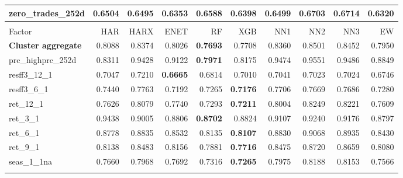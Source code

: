 \begin{longtable}{>{\raggedright\arraybackslash}p{2.6cm}rrrrrrrrr}
zero\_trades\_252d & 0.6504 & \cellcolor{blue!10}0.6495 & \cellcolor{blue!10}0.6353 & 0.6588 & \cellcolor{blue!10}0.6398 & \cellcolor{blue!10}0.6499 & 0.6703 & 0.6714 & \textbf{\cellcolor{blue!10}0.6320} \\
\hline
\multicolumn{10}{@{}l}{\textit{Panel F. Momentum}} \\
\hline
Factor & HAR & HARX & ENET & RF & XGB & NN1 & NN2 & NN3 & EW \\
\hline
\textbf{Cluster aggregate} & 0.8088 & 0.8374 & \cellcolor{blue!10}0.8026 & \textbf{\cellcolor{blue!10}0.7693} & \cellcolor{blue!10}0.7708 & 0.8360 & 0.8501 & 0.8452 & \cellcolor{blue!10}0.7950 \\
prc\_highprc\_252d & 0.8311 & 0.9428 & 0.9122 & \textbf{\cellcolor{blue!10}0.7971} & \cellcolor{blue!10}0.8175 & 0.9474 & 0.9551 & 0.9486 & 0.8849 \\
resff3\_12\_1 & 0.7047 & 0.7210 & \textbf{\cellcolor{blue!10}0.6665} & \cellcolor{blue!10}0.6814 & \cellcolor{blue!10}0.7010 & \cellcolor{blue!10}0.7041 & \cellcolor{blue!10}0.7023 & \cellcolor{blue!10}0.7024 & \cellcolor{blue!10}0.6746 \\
resff3\_6\_1 & 0.7440 & 0.7763 & \cellcolor{blue!10}0.7192 & \cellcolor{blue!10}0.7265 & \textbf{\cellcolor{blue!10}0.7176} & 0.7706 & 0.7669 & 0.7686 & \cellcolor{blue!10}0.7280 \\
ret\_12\_1 & 0.7626 & 0.8079 & 0.7740 & \cellcolor{blue!10}0.7293 & \textbf{\cellcolor{blue!10}0.7211} & 0.8004 & 0.8249 & 0.8221 & \cellcolor{blue!10}0.7609 \\
ret\_3\_1 & 0.9438 & \cellcolor{blue!10}0.9005 & \cellcolor{blue!10}0.8806 & \textbf{\cellcolor{blue!10}0.8702} & \cellcolor{blue!10}0.8824 & \cellcolor{blue!10}0.9107 & \cellcolor{blue!10}0.9240 & \cellcolor{blue!10}0.9176 & \cellcolor{blue!10}0.8797 \\
ret\_6\_1 & 0.8778 & 0.8835 & \cellcolor{blue!10}0.8532 & \cellcolor{blue!10}0.8135 & \textbf{\cellcolor{blue!10}0.8107} & 0.8830 & 0.9068 & 0.8935 & \cellcolor{blue!10}0.8430 \\
ret\_9\_1 & 0.8138 & 0.8483 & 0.8156 & \cellcolor{blue!10}0.7881 & \textbf{\cellcolor{blue!10}0.7716} & 0.8475 & 0.8720 & 0.8659 & \cellcolor{blue!10}0.8080 \\
seas\_1\_1na & 0.7660 & 0.7968 & 0.7692 & \cellcolor{blue!10}0.7316 & \textbf{\cellcolor{blue!10}0.7265} & 0.7975 & 0.8188 & 0.8153 & \cellcolor{blue!10}0.7566 \\
\hline
\multicolumn{10}{@{}l}{\textit{Panel G. Profit Growth}} \\

\end{longtable}
